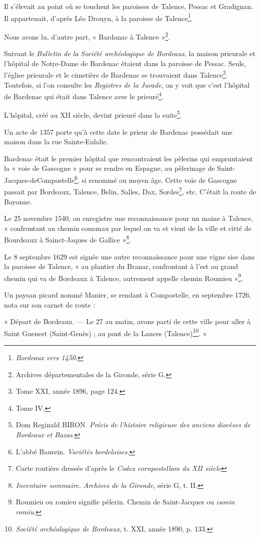 \documentclass[a4paper,11pt]{book}
\begin{document}
Il s'élevait au point où se touchent les paroisses de Talence, Pessac et Gradignan. Il appartenait, d'après Léo Drouyn, à la paroisse de Talence\footnote{\textit{Bordeaux vers 1450}.}.

Nous avons lu, d'autre part, « Bardanac à Talence »\footnote{Archives départementales de la Gironde, série G.}.

Suivant le \textit{Bulletin de la Société archéologique de Bordeaux}, la maison prieurale et l'hôpital de Notre-Dame de Bardenac étaient dans la paroisse de Pessac. Seuls, l'église prieurale et le cimetière de Bardenac se trouvaient dans Talence\footnote{Tome XXI, année 1896, page 124.}. Toutefois, si l'on consulte les \textit{Registres de la Jurade}, on y voit que c'est l'hôpital de Bardenac qui était dans Talence avec le prieuré\footnote{Tome IV.}.

L'hôpital, créé au XII\ieme{} siècle, devint prieuré dans la suite\footnote{Dom Reginald BIRON. \textit{Précis de l'histoire religieuse des anciens diocèses de Bordeaux et Bazas}.}.

Un acte de 1357 porte qu'à cette date le prieur de Bardenac possédait une maison dans la rue Sainte-Eulalie.

Bardenac était le premier hôpital que rencontraient les pèlerins qui empruntaient la « voie de Gascogne » pour se rendre en Espagne, au pèlerinage de Saint-Jacques-deCompostelle\footnote{L'abbé Baurein. \textit{Variétés bordeloises}.}, si renommé ou moyen âge. Cette voie de Gascogne passait par Bordeaux, Talence, Belin, Salles, Dax, Sordes\footnote{Carte routière dressée d'après le \textit{Codex cornpostellam du XII\ieme{} siècle}}, etc. C'était la route de Bayonne.

Le 25 novembre 1540, on enregistre une reconnaissance pour un maine à Talence, « confrontant au chemin comunau par lequel on va et vient de la ville et citté de Bourdeaux à Sainct-Jaques de Gallice »\footnote{\textit{Inventaire sommaire. Archives de la Gironde}, série G, t. II.}.

Le 8 septembre 1629 est signée une autre reconnaissance pour une vigne sise dans la paroisse de Talence, « au plantier du Branar, confrontant à l'est au grand chemin qui va de Bordeaux à Talence, autrement appelle chemin Roumieu »\footnote{Roumieu ou romieu signifie pèlerin. Chemin de Saint-Jacques ou \textit{camin romiu}.}.

Un paysan picard nommé Manier, se rendant à Compostelle, en septembre 1726, nota sur son carnet de route :

« Départ de Bordeaux. — Le 27 au matin, avons parti de cette ville pour aller à Saint Guenest (Saint-Genès) ; au pont de la Lances (Talence)\footnote{\textit{Société archéologique de Bordeaux}, t. XXI, année 1890, p. 133.}. »
\end{document}
